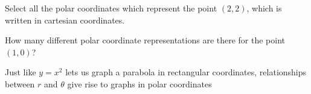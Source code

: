 \documentclass{ximera}
\begin{document}
\begin{question}
	Select all the polar coordinates which represent the point $(2,2)$, which is written in cartesian coordinates.
	
	\begin{selectAll}
	\end{selectAll}
\end{question}


\begin{question}
	How many different polar coordinate representations are there for the point $(1,0)$?
	
	\begin{multipleChoice}
	\end{multipleChoice}
\end{question}

Just like $y=x^2$ lets us graph a parabola in rectangular coordinates, relationships between $r$ and $\theta$ give rise to graphs in polar coordinates
\end{document}
